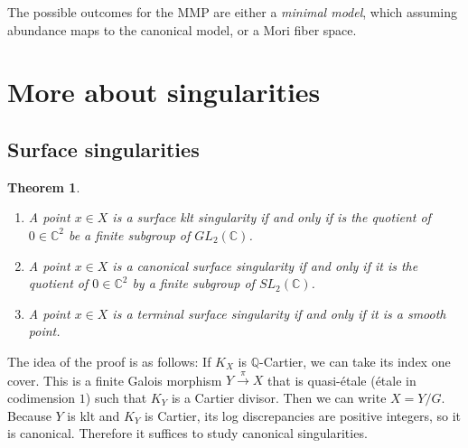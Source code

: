 \documentclass[leqno, openany]{memoir}
\newtheorem{thm}{Theorem}[section]
\theoremstyle{definition}
\theoremstyle{remark}
\theoremstyle{plain}
\theoremstyle{definition}
\theoremstyle{remark}
\newcommand{\C}{\mathbb{C}}
\newcommand{\Q}{\mathbb{Q}}
\begin{document}
The possible outcomes for the MMP are either a \textit{minimal model}, which assuming abundance maps to the canonical model, or a Mori fiber space.

\section{More about singularities}%
\label{sec:surface_singularities_of_the_mmp}

\subsection{Surface singularities}%
\label{sub:surface_singularities}

\begin{thm}\leavevmode
    \begin{enumerate}
        \item A point $x \in X$ is a surface klt singularity if and only if is the quotient of $0 \in \C^2$ be a finite subgroup of $GL_2(\C)$.
        \item A point $x \in X$ is a canonical surface singularity if and only if it is the quotient of $0 \in \C^2$ by a finite subgroup of $SL_2(\C)$.
        \item A point $x \in X$ is a terminal surface singularity if and only if it is a smooth point.
    \end{enumerate}
\end{thm}

The idea of the proof is as follows: If $K_X$ is $\Q$-Cartier, we can take its index one cover. This is a finite Galois morphism $Y \xrightarrow{\pi} X$ that is quasi-\'etale (\'etale in codimension $1$) such that $K_Y$ is a Cartier divisor. Then we can write $X = Y/G$. Because $Y$ is klt and $K_Y$ is Cartier, its log discrepancies are positive integers, so it is canonical. Therefore it suffices to study canonical singularities.
\end{document}
